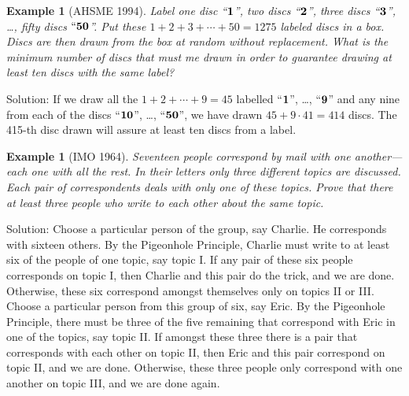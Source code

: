 \documentclass[11pt, openany]{book}
\theoremstyle{change} \theoremheaderfont{\blue\sffamily\bfseries}
\newtheorem{exa}[thm]{Example}
\theoremstyle{nonumberplain} \theoremheaderfont{\sffamily\bfseries}
\newcommand{\í}{\'{\i}}
\begin{document}
\begin{exa}[AHSME 1994] Label one disc ``${\bf 1}$'', two discs
``${\bf 2}$'', three discs ``${\bf 3}$'', \ldots , fifty discs
$``{\bf 50}$''. Put these $1 + 2 + 3 + \cdots + 50 = 1275$ labeled
discs in a box. Discs are then drawn from the box at random
without replacement. What is the minimum number of discs that must
me drawn in order to guarantee drawing at least ten discs with the
same label? \end{exa} Solution: If we draw all the $1 + 2 + \cdots
+ 9 = 45$ labelled ``${\bf 1}$'', \ldots , ``${\bf 9}$'' and any
nine from each of the discs ``${\bf 10}$'', \ldots , ``${\bf
50}$'', we have drawn $45 + 9\cdot 41 = 414$ discs. The 415-th
disc drawn will assure at least ten discs from a label.
\begin{exa}[IMO 1964] Seventeen people correspond by mail with
one another---each one with all the rest. In their letters only
three different topics are discussed. Each pair of correspondents
deals with only one of these topics. Prove that there at least
three people who write to each other about the same topic.
\end{exa} Solution: Choose a particular person of the group, say
Charlie. He corresponds with sixteen others. By the Pigeonhole
Principle, Charlie must write to at least six of the people of one
topic, say topic I. If any pair of these six people corresponds on
topic I, then Charlie and this pair do the trick, and we are done.
Otherwise, these six correspond amongst themselves only on topics
II or III. Choose a particular person from this group of six, say
Eric. By the Pigeonhole Principle, there must be three of the five
remaining that correspond with Eric in one of the topics, say
topic II. If amongst these three there is a pair that corresponds
with each other on topic II, then Eric and this pair correspond on
topic II, and we are done. Otherwise, these three people only
correspond with one another on topic III, and we are done again.
\end{document}
